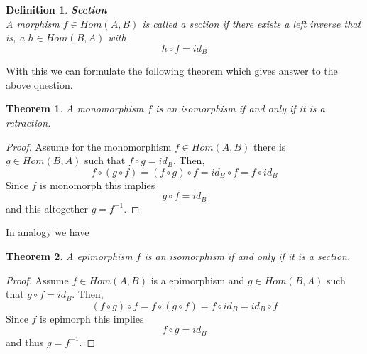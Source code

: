 \documentclass[17pt]{extarticle}
\newtheorem{theorem}{Theorem}[section]
\newtheorem{definition}{Definition}
\begin{document}
\begin{definition}
	\textbf{Section}\\
	A morphism $f\in Hom(A,B)$ is called a section  if there exists a left inverse that is,
	a $h\in Hom(B,A)$ with
	$$h\circ f=id_B$$
\end{definition}

With this we can formulate the following theorem which gives answer to the above question.
\begin{theorem}
	A monomorphism $f$ is an isomorphism if and only if it is a retraction.
\end{theorem}
\begin{proof}
	Assume for the monomorphism $f\in Hom(A,B)$ there is $g\in Hom(B,A)$ such that $f\circ g=id_B$.
	Then,
	$$f\circ(g\circ f)=(f\circ g)\circ f=id_B\circ f=f\circ id_B$$
	Since $f$ is monomorph this implies
	$$g\circ f=id_B$$
	and this altogether $g=f^{-1}$.
\end{proof}

In analogy we have
\begin{theorem}
	A epimorphism $f$ is an isomorphism if and only if it is a section.
\end{theorem}
\begin{proof}
	Assume $f\in Hom(A,B)$ is a epimorphism and $g\in Hom(B,A)$ such that $g\circ f=id_B$. Then,
	$$(f\circ g)\circ f =f\circ(g\circ f)=f\circ id_B=id_B\circ f$$
	Since $f$ is epimorph this implies
	$$f\circ g=id_B$$
	and thus $g=f^{-1}$.
\end{proof}
\end{document}
